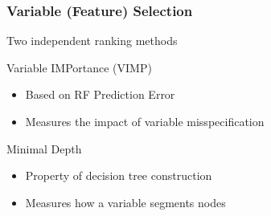 \documentclass[xcolor=svgnames]{beamer}\usepackage[]{graphicx}\usepackage[]{color}
\begin{document}

\begin{frame}
\frametitle{Variable (Feature) Selection}

Two independent ranking methods

Variable IMPortance (VIMP)

\begin{itemize}
\item Based on RF Prediction Error
\item Measures the impact of variable misspecification
\end{itemize}

Minimal Depth

\begin{itemize}
\item Property of decision tree construction
\item Measures how a variable segments nodes
\end{itemize}
\end{frame}
%
%
%
\end{document}
